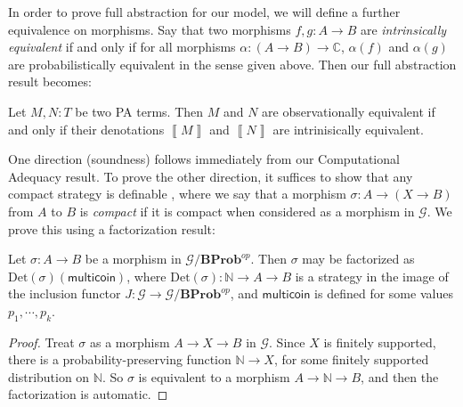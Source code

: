 \documentclass{svproc}
\newcommand{\deno}[1]{\left\llbracket#1\right\rrbracket}
\newcommand\G{\mathcal{G}}
\newcommand*\from{\colon}
\newcommand{\0}{{\mathtt{0}}} \newcommand{\com}{{\mathtt{com}}}
\newcommand{\catname}[1]{\mathbf{#1}}
\newcommand{\BProb}{\catname{BProb}}
\newcommand{\bN}{\mathbb{N}}
\newcommand{\bC}{\mathbb{C}}
\newcommand{\multicoin}{\textsf{multicoin}}
\begin{document}
In order to prove full abstraction for our model, we will define a further equivalence on morphisms.  
Say that two morphisms $f,g\from A \to B$ are \emph{intrinsically equivalent} if and only if for all morphisms $\alpha\from (A\to B)\to\bC$, $\alpha(f)$ and $\alpha(g)$ are probabilistically equivalent in the sense given above.
Then our full abstraction result becomes:

\begin{proposition}
  Let $M,N\from T$ be two PA terms.  
  Then $M$ and $N$ are observationally equivalent if and only if their denotations $\deno{M}$ and $\deno{N}$ are intrinisically equivalent.
\end{proposition}

One direction (soundness) follows immediately from our Computational Adequacy result.  
To prove the other direction, it suffices to show that any compact strategy is definable \cite{CurienFullAbstraction}, where we say that a morphism $\sigma\from A \to (X \to B)$ from $A$ to $B$ is \emph{compact} if it is compact when considered as a morphism in $\G$.
We prove this using a factorization result:
\begin{lemma}
  Let $\sigma\from A \to B$ be a morphism in $\G/\BProb^{op}$.  
  Then $\sigma$ may be factorized as $\text{Det}(\sigma)(\multicoin)$, where $\text{Det}(\sigma)\from \bN \to A \to B$ is a strategy in the image of the inclusion functor $J\from \G \to \G/\BProb^{op}$, and $\multicoin$ is defined for some values $p_1,\cdots,p_k$.
\end{lemma}
\begin{proof}
  Treat $\sigma$ as a morphism $A \to X \to B$ in $\G$.  
  Since $X$ is finitely supported, there is a probability-preserving function $\bN \to X$, for some finitely supported distribution on $\bN$.  
  So $\sigma$ is equivalent to a morphism $A \to \bN \to B$, and then the factorization is automatic.
\end{proof}



\end{document}
